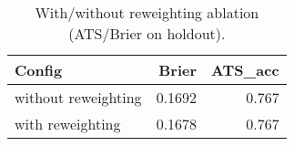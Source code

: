 \begin{table}

\caption{\label{tab:unnamed-chunk-2}With/without reweighting ablation (ATS/Brier on holdout).}
\centering
\begin{tabular}[t]{lrr}
\toprule
Config & Brier & ATS\_acc\\
\midrule
without reweighting & 0.1692 & 0.767\\
with reweighting & 0.1678 & 0.767\\
\bottomrule
\end{tabular}
\end{table}
